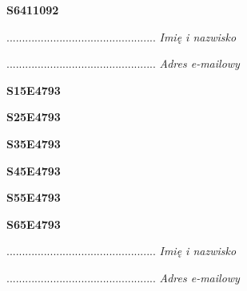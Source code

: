 \begin{turn}{90}\huge \textbf{S6411092}\end{turn}

\begin{turn}{90}\begin{minipage}{\linewidth} \vspace{20mm} ................................................  \textit{Imię i nazwisko}\end{minipage}\end{turn}

\begin{turn}{90}\begin{minipage}{\linewidth} \vspace{20mm} ................................................  \textit{Adres e-mailowy}\end{minipage}\end{turn}

\begin{turn}{90}\huge \textbf{S15E4793}\end{turn}

\begin{turn}{90}\huge \textbf{S25E4793}\end{turn}

\begin{turn}{90}\huge \textbf{S35E4793}\end{turn}

\begin{turn}{90}\huge \textbf{S45E4793}\end{turn}

\begin{turn}{90}\huge \textbf{S55E4793}\end{turn}

\begin{turn}{90}\huge \textbf{S65E4793}\end{turn}

\begin{turn}{90}\begin{minipage}{\linewidth} \vspace{20mm} ................................................  \textit{Imię i nazwisko}\end{minipage}\end{turn}

\begin{turn}{90}\begin{minipage}{\linewidth} \vspace{20mm} ................................................  \textit{Adres e-mailowy}\end{minipage}\end{turn}

